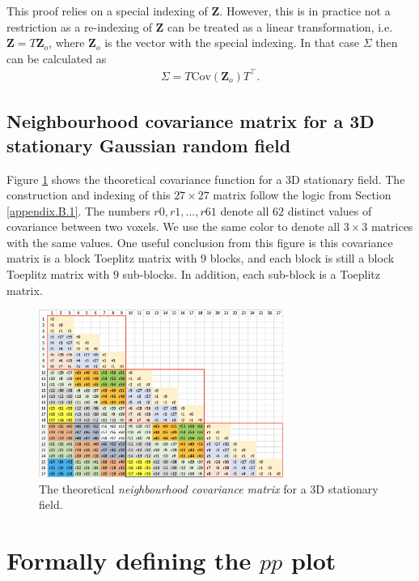 \documentclass{article}
\newcommand{\nt}[1]{\textit{\color{red} #1}}
\begin{document}
This proof relies on a special indexing of $\mathbf{Z}$. However, this is in practice not a restriction as a re-indexing of $\mathbf{Z}$ can be treated as a linear transformation, i.e. $\mathbf{Z} = T \mathbf{Z}_o$, where $\mathbf{Z}_o$ is the vector with the special indexing. In that case $\Sigma$ then can be calculated as
\begin{align*}
	\Sigma = T \mathrm{Cov}(\mathbf{Z}_o) T^\top.
\end{align*}

\subsection{Neighbourhood covariance matrix for a 3D stationary Gaussian random field}\label{SS:cov}
Figure \ref{fig17} shows the theoretical covariance function for a 3D stationary field. The construction and indexing of this $27 \times 27$ matrix follow the logic from Section \ref{appendix.B.1}. The numbers $r0,r1,...,r61$ denote all $62$ distinct values of covariance between two voxels. We use the same color to denote all $3\times 3$ matrices with the same values. One useful conclusion from this figure is this covariance matrix is a block Toeplitz matrix with $9$ blocks, and each block is still a block Toeplitz matrix with $9$ sub-blocks. In addition, each sub-block is a Toeplitz matrix. 

\begin{figure}[!htp]
\centering
\includegraphics[width = 8cm]{figure/covariance function_3D.png}
\caption{The theoretical \nt{neighbourhood covariance matrix} for a 3D stationary field.\label{fig17}}
\end{figure}

\section{Formally defining the $pp$ plot\label{appendix.d}}
\end{document}
